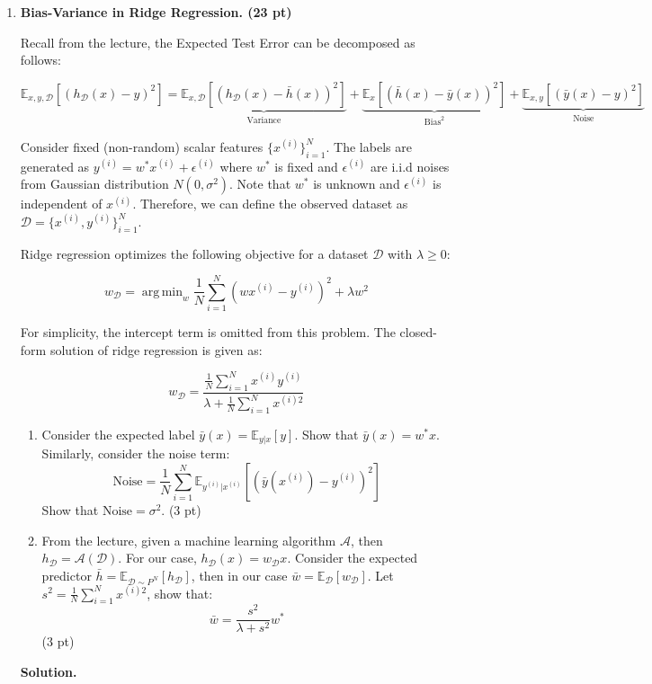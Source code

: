 \documentclass{article}
\DeclareMathOperator*{\argmin}{arg\,min}
\theoremstyle{definition}
\theoremstyle{remark}
\newenvironment{Q}
    {%
      \clearpage
      \item
    }
    {%
      \phantom{s}
      \bigskip
      \textbf{Solution.}
    }
\begin{document}
\begin{enumerate}[font={\Large\bfseries},left=0pt]


	\begin{Q}

		\textbf{\Large Bias-Variance in Ridge Regression. (23 pt)}

		Recall from the lecture, the Expected Test Error can be decomposed as follows:

		$$
			\mathbb{E}_{x, y, \mathcal{D}}[(h_{\mathcal{D}}(x) - y )^2] = \underbrace{\mathbb{E}_{x, \mathcal{D}}[(h_{\mathcal{D}}(x) - \bar{h}(x))^2]}_{\text{Variance}} + \underbrace{\mathbb{E}_{x}[(\bar{h}(x)-\bar{y}(x))^2]}_{\text{Bias}^2} + \underbrace{\mathbb{E}_{x, y}[(\bar{y}(x)-y)^2]}_{\text{Noise}}
		$$

		Consider fixed (non-random) scalar features $\{x^{(i)}\}_{i=1}^N$. The labels are generated as $y^{(i)}=w^* x^{(i)}+\epsilon^{(i)}$ where $w^{*}$ is fixed and $\epsilon^{(i)}$ are i.i.d noises from Gaussian distribution $N(0,\sigma^2)$. Note that $w^{*}$ is unknown and $\epsilon^{(i)}$ is independent of $x^{(i)}$. Therefore, we can define the observed dataset as $\mathcal{D} = \{x^{(i)}, y^{(i)}\}_{i=1}^N$.

		Ridge regression optimizes the following objective for a dataset $\mathcal{D}$ with $\lambda \geq 0$:

		$$
			w_{\mathcal{D}} = \argmin_w \frac{1}{N} \sum_{i=1}^N (wx^{(i)}-y^{(i)})^2 + \lambda w^2
		$$

		For simplicity, the intercept term is omitted from this problem. The closed-form solution of ridge regression is given as:

		$$
			w_{\mathcal{D}} = \frac{\frac{1}{N}\sum_{i=1}^N x^{(i)} y^{(i)}}{\lambda + \frac{1}{N} \sum_{i=1}^N x^{(i)2}}
		$$

		\begin{enumerate}
			\item Consider the expected label $\bar{{y}}(x) = \mathbb{E}_{y|x}[y]$. Show that $\bar{{y}}(x) = w^{*}x$. Similarly, consider the noise term:
			      $$
				      \text{Noise} = \frac{1}{N} \sum_{i=1}^N \mathbb{E}_{y^{(i)}|x^{(i)}}[(\bar{y}(x^{(i)})-y^{(i)})^2]
			      $$
			      Show that $\text{Noise}=\sigma^2$. (3 pt)

			\item From the lecture, given a machine learning algorithm $\mathcal{A}$, then $h_{\mathcal{D}}=\mathcal{A}(\mathcal{D})$. For our case, $h_{\mathcal{D}}(x) = w_{\mathcal{D}}x$. Consider the expected predictor $\bar{h} = \mathbb{E}_{\mathcal{D}\sim P^{N}} \left[h_{\mathcal{D}}\right]$, then in our case $\bar{w} =  \mathbb{E}_{\mathcal{D}} [w_{\mathcal{D}}]$. Let $s^2 = \frac{1}{N}\sum_{i=1}^N x^{(i)2}$, show that:
			      $$
				      \bar{w} = \frac{s^2}{\lambda + s^2} w^{*}
			      $$
			      (3 pt)


\end{enumerate}
\end{Q}
\end{enumerate}
\end{document}
